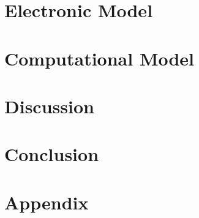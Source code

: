 \documentclass[12pt]{article}
\begin{document}
\section{Electronic Model}
    \label{section3}

\newpage
\section{Computational Model}
    \label{section4}

\newpage
\section{Discussion}
    \label{section5}

\section{Conclusion}
    \label{section6}

\newpage


\newpage
\section{Appendix}
    \label{appendix1}
    
\end{document}
